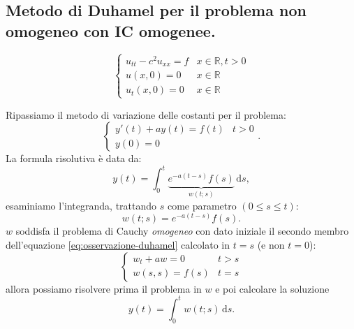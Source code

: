 \documentclass[10pt,a4paper,twoside,openright]{book}
\newcommand{\de}{\,\mathrm d}
\newcommand{\ds}{\de s}
\begin{document}
\subsection{Metodo di Duhamel per il problema non omogeneo con IC omogenee.}
\begin{equation}
    \begin{cases}
        u_{tt} -c^{2} u_{xx} =f & x\in \mathbb{R} ,t >0 \\
        u(x,0) =0               & x\in \mathbb{R}       \\
        u_{t}(x,0) =0           & x\in \mathbb{R}
    \end{cases}
\end{equation}
\begin{oss}
    Ripassiamo il metodo di variazione delle costanti per il problema:
    \begin{equation*}
        \begin{cases}
            y'(t) +ay(t) =f(t) & t >0 \\
            y(0) =0            &
        \end{cases} .
    \end{equation*}
    La formula risolutiva è data da:
    \begin{equation*}
        y(t) =\int _{0}^{t}\underbrace{e^{-a(t-s)} f(s)}_{w(t;s)} \ds,
    \end{equation*}
    esaminiamo l'integranda, trattando $s$ come parametro $\displaystyle (0\leqslant s\leqslant t)$:
    \begin{equation}
        w(t;s) =e^{-a(t-s)} f(s) .
        \label{eq:osservazione-duhamel}
    \end{equation}
    $w$ soddisfa il problema di Cauchy \textit{omogeneo} con dato iniziale il secondo membro dell'equazione \eqref{eq:osservazione-duhamel} calcolato in $t=s$ (e non $t=0$):
    \begin{equation*}
        \begin{cases}
            w_{t} +aw=0  & t >s \\
            w(s,s) =f(s) & t=s
        \end{cases}
    \end{equation*}
    allora possiamo risolvere prima il problema in $w$ e poi calcolare la soluzione
    \begin{equation*}
        y(t) =\int _{0}^{t} w(t;s) \ds.
    \end{equation*}
\end{oss}
\end{document}
